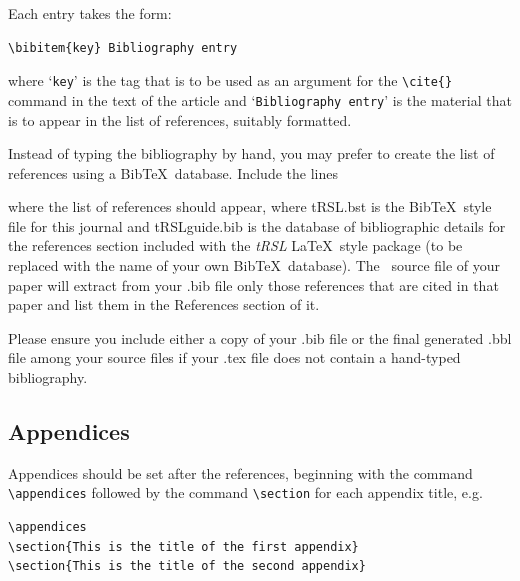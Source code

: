 \documentclass[]{tRSL2e}
\begin{document}
\medskip
\noindent Each entry takes the form:
\medskip
\begin{verbatim}
\bibitem{key} Bibliography entry
\end{verbatim}

\noindent where `{\tt key}' is the tag that is to be used as an argument for the \verb"\cite{}" command in the text of the article and `{\tt Bibliography entry}' is the material that is to appear in the list of references, suitably formatted.

Instead of typing the bibliography by hand, you may prefer to create the list of references using a B{\sc ib}\TeX\ database. Include the lines \vspace{12pt}

\noindent\verb""
\newline\verb""
\vspace{12pt}

\noindent where the list of references should appear, where tRSL.bst is the B{\sc ib}\TeX\ style file for this journal and tRSLguide.bib is the database of bibliographic details for the references section included with the {\itshape tRSL} \LaTeX\ style package (to be replaced with the name of your own B{\sc ib}\TeX\ database). The \LaTeXe\ source file of your paper will extract from your .bib file only those references that are cited in that paper and list them in the References section of it.

Please ensure you include either a copy of your .bib file or the final generated .bbl file among your source files if your .tex file does not contain a hand-typed bibliography.

\subsection{Appendices}

Appendices should be set after the references, beginning with the command \verb"\appendices" followed by the
command \verb"\section" for each appendix title, e.g.
%
\begin{verbatim}
\appendices
\section{This is the title of the first appendix}
\section{This is the title of the second appendix}
\end{verbatim}
\end{document}
